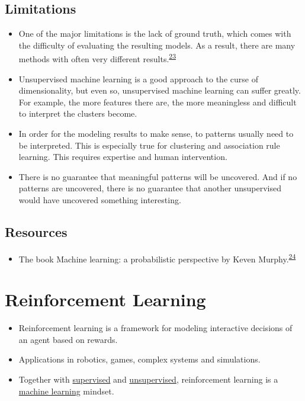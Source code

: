 \documentclass[
  10pt,
]{scrbook}
\providecommand{\tightlist}{%
  \setlength{\itemsep}{0pt}\setlength{\parskip}{0pt}}
\begin{document}
\hypertarget{limitations-7}{%
\section{Limitations}\label{limitations-7}}

\begin{itemize}
\tightlist
\item
  One of the major limitations is the lack of ground truth, which comes with the difficulty of evaluating the resulting models. As a result, there are many methods with often very different results.\textsuperscript{\protect\hyperlink{ref-hastie2009elements}{23}}
\item
  Unsupervised machine learning is a good approach to the curse of dimensionality, but even so, unsupervised machine learning can suffer greatly. For example, the more features there are, the more meaningless and difficult to interpret the clusters become.
\item
  In order for the modeling results to make sense, to patterns usually need to be interpreted. This is especially true for clustering and association rule learning. This requires expertise and human intervention.
\item
  There is no guarantee that meaningful patterns will be uncovered. And if no patterns are uncovered, there is no guarantee that another unsupervised would have uncovered something interesting.
\end{itemize}

\hypertarget{resources-1}{%
\section{Resources}\label{resources-1}}

\begin{itemize}
\tightlist
\item
  The book Machine learning: a probabilistic perspective by Keven Murphy.\textsuperscript{\protect\hyperlink{ref-murphy2012machine}{24}}
\end{itemize}

\hypertarget{reinforcement-learning}{%
\chapter{Reinforcement Learning}\label{reinforcement-learning}}

\begin{itemize}
\tightlist
\item
  Reinforcement learning is a framework for modeling interactive decisions of an agent based on rewards.
\item
  Applications in robotics, games, complex systems and simulations.
\item
  Together with \protect\hyperlink{supervised}{supervised} and \protect\hyperlink{unsupervised-ml}{unsupervised}, reinforcement learning is a \protect\hyperlink{machine-learning}{machine learning} mindset.
\end{itemize}
\end{document}
